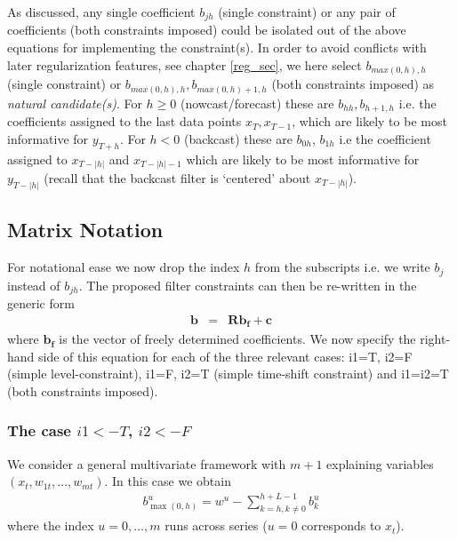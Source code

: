 \documentclass[a4paper]{book}
\begin{document}
As discussed, any single coefficient $b_{jh}$ (single constraint) or any pair of coefficients (both constraints imposed) could be isolated out of the above equations for implementing the constraint(s). In order to avoid conflicts with later regularization features, see chapter \ref{reg_sec}, we here select $b_{max(0,h),h}$ (single constraint) or $b_{max(0,h),h},b_{max(0,h)+1,h}$ (both constraints imposed) as \emph{natural candidate(s)}. For $h\geq 0$ (nowcast/forecast) these are $b_{hh}, b_{h+1,h}$ i.e. the coefficients assigned to the last data points $x_T,x_{T-1}$, which are likely to be most informative for $y_{T+h}$. For $h<0$ (backcast) these are $b_{0h}$, $b_{1h}$ i.e the coefficient assigned to $x_{T-|h|}$ and $x_{T-|h|-1}$ which are likely to be most informative for $y_{T-|h|}$  (recall that the backcast filter is `centered' about $x_{T-|h|}$).








\subsection{Matrix Notation}\label{matrix_notation_constraints}

For notational ease we now drop the index $h$ from the subscripts i.e. we write $b_j$ instead of $b_{jh}$. The proposed filter constraints can then be re-written in the generic form
\begin{eqnarray}\label{cons5s}
\mathbf{b}&=&\mathbf{R b_{f}}+\mathbf{c}
\end{eqnarray}
where $\mathbf{b_f}$ is the vector of freely determined coefficients. We now specify the right-hand side of this equation for each of the three relevant cases: i1=T, i2=F (simple level-constraint), i1=F, i2=T (simple time-shift constraint) and i1=i2=T (both constraints imposed).  


\subsubsection{The case $i1<-T$, $i2<-F$}

We consider a general multivariate framework with $m+1$ explaining variables $(x_t,w_{1t},...,w_{mt})$. In this case we obtain
\begin{eqnarray*}
b_{\max(0,h)}^u=w^u-\sum_{k=h,k\not=0}^{h+L-1}b_k^u
\end{eqnarray*}
where the index $u=0,...,m$ runs across series ($u=0$ corresponds to $x_t$). \\
\end{document}
